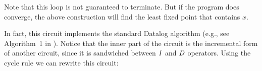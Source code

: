 %
%

Note that this loop is not guaranteed to terminate.  But if the
program does converge, the above construction will find the least
fixed point that contains $x$.

In fact, this circuit implements the standard Datalog
 algorithm (e.g., see Algorithm~1 in
\cite{greco-sldm15}).  Notice that the inner part of the circuit is
the incremental form of another circuit, since it is sandwiched
between $\mathit{I}$ and $\mathit{D}$ operators.  Using the cycle rule we can
rewrite this circuit:

\begin{center}
\end{center}

